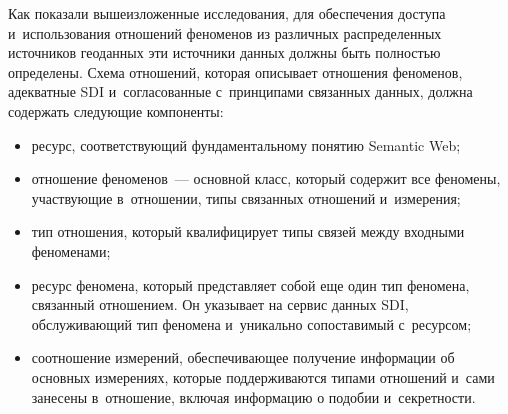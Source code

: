 \begin{multicols}{2}
     Как показали вышеизложенные исследования, для обеспечения доступа 
     и~использования отношений феноменов из различных распределенных\linebreak 
источников геоданных эти источники данных должны быть полностью 
определены. Схема отношений, которая описывает отношения феноменов, 
адекватные SDI и~согласованные с~принципами связанных данных, должна 
содержать следующие компоненты:
     \begin{itemize}
\item ресурс, соответствующий фундаментальному понятию Semantic Web; 
\item отношение феноменов~--- основной класс, который содержит все 
феномены, участвующие в~отношении, типы связанных отношений 
и~измерения;
\item тип отношения, который квалифицирует типы связей между входными 
феноменами;
\item ресурс феномена, который представляет собой еще один тип феномена, 
связанный отношением. Он указывает на сервис данных SDI, 
обслуживающий тип феномена и~уникально сопоставимый с~ресурсом; 
\item соотношение измерений, обеспечивающее получение информации об 
основных измерениях, которые поддерживаются типами отношений и~сами 
занесены в~отношение, включая информацию о подобии и~секретности. 
\end{itemize}


\end{multicols}
